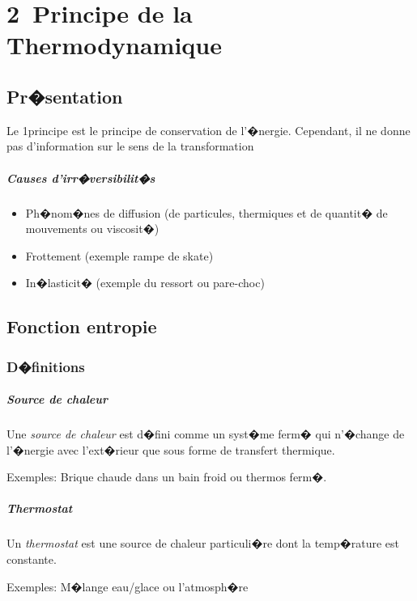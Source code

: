 \chapter{2\ieme~Principe de la Thermodynamique}

\section{Pr�sentation}

Le 1\ier principe est le principe de conservation de l'�nergie. Cependant, il ne donne pas d'information sur le sens de la transformation

\paragraph{Causes d'irr�versibilit�s}
\begin{itemize}
	\item Ph�nom�nes de diffusion (de particules, thermiques et de quantit� de mouvements ou viscosit�)
	\item Frottement (exemple rampe de skate)
	\item In�lasticit� (exemple du ressort ou pare-choc)
\end{itemize}

\section{Fonction entropie}

  \subsection{D�finitions}

    \paragraph{Source de chaleur}
    Une \emph{source de chaleur} est d�fini comme un syst�me ferm� qui n'�change de l'�nergie avec l'ext�rieur que sous forme de transfert thermique.

    Exemples: Brique chaude dans un bain froid ou thermos ferm�.

    \paragraph{Thermostat}
    Un \emph{thermostat} est une source de chaleur particuli�re dont la temp�rature est constante.

    Exemples: M�lange eau/glace ou l'atmosph�re


